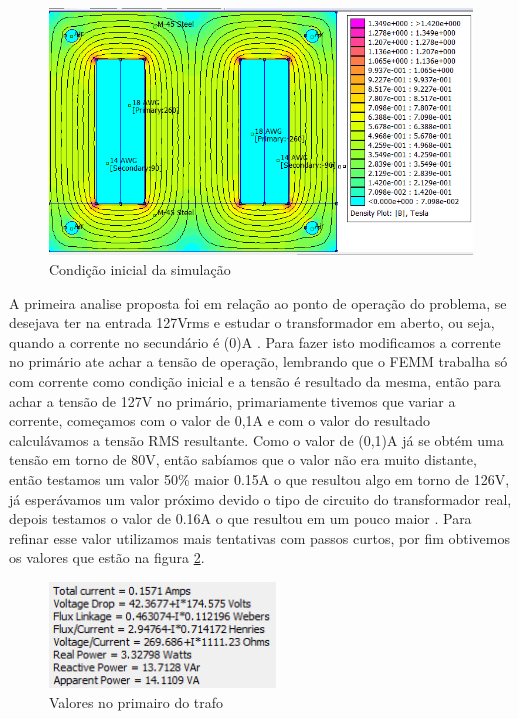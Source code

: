 \documentclass[
	12pt,				%
	openright,			%
	twoside,			%
	a4paper,			%
	english,			%
	french,				%
	spanish,			%
	brazil,				%
	]{abntex2}
\begin{document}
\begin{figure}[H]
    \centering
    \includegraphics[width=15cm]{img/simulacao_traf.png}
    \caption{Condição inicial da simulação}
    \label{fig:simulacao_inicial}
\end{figure}


A primeira analise proposta foi em relação ao ponto de operação do problema, se desejava ter na entrada 127Vrms e estudar o transformador em aberto, ou seja, quando a corrente no secundário é (0)A . Para fazer isto modificamos a corrente no primário ate achar a tensão de operação, lembrando que o FEMM trabalha só com corrente como condição inicial e a tensão é resultado da mesma, então para achar a tensão de 127V no primário, primariamente tivemos que variar a corrente, começamos com o valor de 0,1A e com o valor do resultado calculávamos a tensão RMS resultante. Como o valor de (0,1)A já se obtém uma tensão em torno de 80V, então sabíamos que o valor não era muito distante, então testamos um valor 50\% maior 0.15A o que resultou algo em torno de 126V, já esperávamos um valor próximo devido o tipo de circuito do transformador real, depois testamos o valor de 0.16A o que resultou em um pouco maior . Para refinar esse valor utilizamos mais tentativas com passos curtos, por fim obtivemos os valores que estão na figura \ref{fig:valores_pri}.

\begin{figure}[H]
    \centering
    \includegraphics[width=6cm]{img/valores_1.png}
    \caption{Valores no primairo do trafo}
    \label{fig:valores_pri}
\end{figure}
\end{document}
